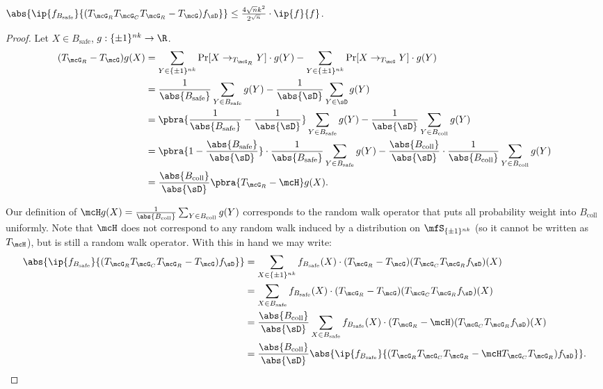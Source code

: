 \begin{lemma}
    $\abs{\ip{f_{B_{\mathrm{safe}}}}{(T_{\mcG_R}T_{\mcG_C}T_{\mcG_R} - T_\mcG) f_{\sD}}} \leq \frac{4\sqrt{n}k^2}{2^{\sqrt{n}}} \cdot \ip{f}{f}$.
\end{lemma}
\begin{proof}
Let $X \in B_{\mathrm{safe}}$, $g : \{\pm1\}^{nk} \to \R$.
\begin{align*}
    (T_{\mcG_R} - T_\mcG)g(X ) &= \sum_{Y \in \{\pm1\}^{nk}} \Pr[X \to_{T_{\mcG_R}} Y] \cdot g(Y) - \sum_{Y \in \{\pm1\}^{nk}} \Pr[X \to_{T_{\mcG}} Y] \cdot g(Y)\\
    &= \frac{1}{\abs{B_{\mathrm{safe}}}}\sum_{Y \in B_{\mathrm{safe}}} g(Y) - \frac{1}{\abs{\sD}}\sum_{Y \in \sD} g(Y)\\
    &= \pbra{\frac{1}{\abs{B_{\mathrm{safe}}}} - \frac{1}{\abs{\sD}}}\sum_{Y \in B_{\mathrm{safe}}} g(Y) - \frac{1}{\abs{\sD}}\sum_{Y \in B_{\mathrm{coll}}} g(Y)\\
    &= \pbra{1 - \frac{\abs{B_{\mathrm{safe}}}}{\abs{\sD}}} \cdot \frac{1}{\abs{B_{\mathrm{safe}}}}\sum_{Y \in B_{\mathrm{safe}}} g(Y) - \frac{\abs{B_{\mathrm{coll}}}}{\abs{\sD}} \cdot \frac{1}{\abs{B_{\mathrm{coll}}}}\sum_{Y \in B_{\mathrm{coll}}} g(Y)\\
    &= \frac{\abs{B_{\mathrm{coll}}}}{\abs{\sD}} \pbra{T_{\mcG_R} - \mcH}g(X).
\end{align*}

Our definition of $\mcH g(X) = \frac{1}{\abs{B_{\mathrm{coll}}}}\sum_{Y \in B_{\mathrm{coll}}} g(Y)$ corresponds to the random walk operator that puts all probability weight into $B_{\mathrm{coll}}$ uniformly. Note that $\mcH$ does not correspond to any random walk induced by a distribution on $\mfS_{\{\pm1\}^{nk}}$ (so it cannot be written as $T_{\mcH}$), but is still a random walk operator. With this in hand we may write:
\begin{align*}
    \abs{\ip{f_{B_{\mathrm{safe}}}}{(T_{\mcG_R}T_{\mcG_C}T_{\mcG_R} - T_\mcG) f_{\sD}}} &= \sum_{X \in \{\pm1\}^{nk}} f_{B_{\mathrm{safe}}}(X) \cdot (T_{\mcG_R}-T_\mcG)(T_{\mcG_C}T_{\mcG_R}f_{\sD})(X)\\
    &= \sum_{X \in B_{\mathrm{safe}}} f_{B_{\mathrm{safe}}}(X) \cdot (T_{\mcG_R}-T_\mcG)(T_{\mcG_C}T_{\mcG_R}f_{\sD})(X)\\
    &= \frac{\abs{B_{\mathrm{coll}}}}{\abs{\sD}} \sum_{X \in B_{\mathrm{safe}}} f_{B_{\mathrm{safe}}}(X) \cdot (T_{\mcG_R}-\mcH)(T_{\mcG_C}T_{\mcG_R}f_{\sD})(X)\\
    &= \frac{\abs{B_{\mathrm{coll}}}}{\abs{\sD}} \abs{\ip{f_{B_{\mathrm{safe}}}}{(T_{\mcG_R}T_{\mcG_C}T_{\mcG_R} - \mcH T_{\mcG_C}T_{\mcG_R}) f_{\sD}}}.
\end{align*}


\end{proof}
